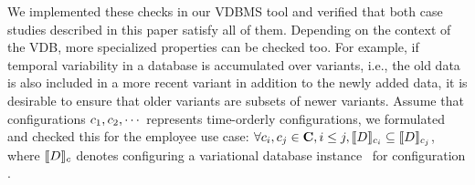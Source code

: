 \noindent
%
We implemented these checks in our VDBMS tool and verified that both case
studies described in this paper satisfy all of them. 
%
Depending on the context of the VDB, 
more specialized properties can be checked too. For example, if temporal 
variability in a database is accumulated over variants, i.e., the old data
is also included in a more recent variant in addition to the newly added data,
it is desirable
to ensure that older variants are subsets of newer variants. 
Assume that configurations \ensuremath{\config_1, \config_2, \cdots}
represents time-orderly configurations, we formulated
and checked this for the employee use case:
\ensuremath{
\forall \config_i, \config_j \in \confSet, i \le j, \sem[\config_i] {\vDB} \subseteq \sem[\config_j]{\vDB}
}, 
where \ensuremath{\sem[\config]{\vDB}} denotes configuring a variational database instance
\vDB\ for configuration \config. 


